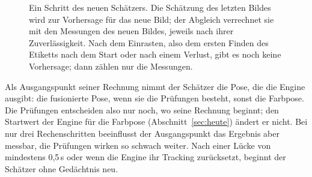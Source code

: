 \documentclass[11pt,a4paper,fleqn]{article}
\begin{document}
\begin{figure}[!htb]
\caption{Ein Schritt des neuen Schätzers. Die Schätzung des letzten Bildes wird zur Vorhersage für das neue Bild;
der Abgleich verrechnet sie mit den Messungen des neuen Bildes, jeweils nach ihrer Zuverlässigkeit. Nach dem
Einrasten, also dem ersten Finden des Etiketts nach dem Start oder nach einem Verlust, gibt es noch keine
Vorhersage; dann zählen nur die Messungen.}
\label{fig:filter}
\end{figure}

Als Ausgangspunkt seiner Rechnung nimmt der Schätzer die Pose, die die Engine ausgibt: die fusionierte Pose, wenn
sie die Prüfungen besteht, sonst die Farbpose. Die Prüfungen entscheiden also nur noch, wo seine Rechnung beginnt;
den Startwert der Engine für die Farbpose (Abschnitt~\ref{sec:heute}) ändert er nicht. Bei nur drei
Rechenschritten beeinflusst der Ausgangspunkt das Ergebnis aber messbar, die Prüfungen wirken so schwach weiter.
Nach einer Lücke von
mindestens 0,5\,s oder wenn die Engine ihr Tracking zurücksetzt, beginnt der Schätzer ohne Gedächtnis neu.
\end{document}
